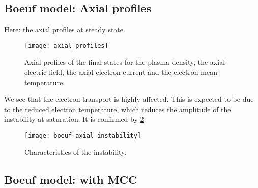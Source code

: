\subsection{Boeuf model: Axial profiles} \label{subsec-axial_boeuf}

Here: the axial profiles at steady state.

\begin{figure}[hbtp]
  \centering
  \texttt{[image: axial\_profiles]}
  \caption{Axial profiles of the final states for the plasma density, the axial electric field, the axial electron current and the electron mean temperature. }
  \label{fig-boeuf_axial}
\end{figure}

We see that the electron transport is highly affected.
This is expected to be due to the reduced electron temperature, which reduces the amplitude of the instability at saturation.
It is confirmed by \cref{fig-boeuf-instability}.

\begin{figure}[hbtp]
  \centering
  \texttt{[image: boeuf-axial-instability]}
  \caption{Characteristics of the instability.}
  \label{fig-boeuf-instability}
\end{figure}


\subsection{Boeuf model: with MCC} \label{subsec-MCC_boeuf}
